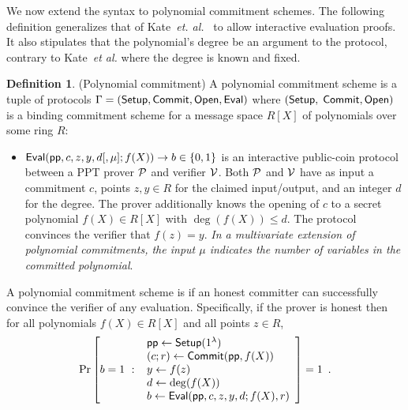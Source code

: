 \documentclass{article}
\theoremstyle{definition}
\newtheorem{definition}{Definition}
\begin{document}
We now extend the syntax to polynomial commitment schemes. The following definition generalizes that of Kate~\emph{et. al.}~\cite{AC:KatZavGol10} to allow interactive evaluation proofs. It also stipulates that the polynomial's degree be an argument to the protocol, contrary to Kate~\emph{et al.} where the degree is known and fixed.

\begin{definition} (Polynomial commitment) 
A polynomial commitment scheme is a tuple of protocols $\Gamma = (\textsf{{Setup}}, \textsf{{Commit}}, \textsf{{Open}}, \textsf{{Eval}})$ where $(\textsf{{Setup}},$ $\textsf{{Commit}}, \textsf{{Open}})$ is a binding commitment scheme for a message space $R[X]$ of polynomials over some ring $R$: 

\begin{itemize}
    \item $\textsf{{Eval}}(\textsf{pp}, c, z, y, d[, \mu]; f(X)) \rightarrow b \in \{0, 1\}$ is an interactive public-coin protocol between a PPT prover $\mathcal{P}$ and verifier $\mathcal{V}$. Both $\mathcal{P}$ and $\mathcal{V}$ have as input a commitment $c$, points $z, y \in R$ for the claimed input/output, and an integer $d$ for the degree. The prover additionally knows the opening of $c$ to a secret polynomial $f(X) \in R[X]$ with $\deg(f(X)) \leq d$. The protocol convinces the verifier that $f(z) = y$. \emph{In a multivariate extension of polynomial commitments, the input $\mu$ indicates the number of variables in the committed polynomial}.
   
\end{itemize}

A polynomial commitment scheme is  if an honest committer can successfully convince the verifier of any evaluation. Specifically, if the prover is honest then for all polynomials $f(X) \in R[X]$ and all points $z \in R$,
\[
    \Pr\left[b = 1 \ : \ \begin{array}{l}
        \textsf{pp} \gets \textsf{{Setup}}(1^\lambda) \\
        (c; r) \gets \textsf{{Commit}}(\textsf{pp}, f(X)) \\
        y \gets f(z) \\
        d \gets \deg(f(X)) \\
        b \gets \textsf{{Eval}}(\textsf{pp}, c, z, y, d; f(X), r) \\
    \end{array} \right] = 1 \enspace .
\]


\end{definition}
\end{document}
